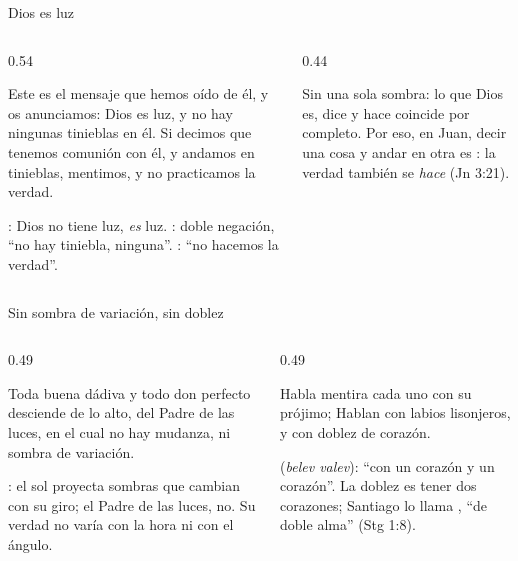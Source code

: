\begin{frame}{Dios es luz}
\begin{columns}[t,onlytextwidth]
\begin{column}{0.54\textwidth}
\begin{cita}Este es el mensaje que hemos oído de él, y os anunciamos: Dios es luz, y no hay ningunas tinieblas en él. Si decimos que tenemos comunión con él, y andamos en tinieblas, mentimos, y no practicamos la verdad.\end{cita}
\scriptsize{}: Dios no tiene luz, \emph{es} luz. : doble negación, ``no hay tiniebla, ninguna''. : ``no hacemos la verdad''.
\end{column}
\begin{column}{0.44\textwidth}
\centering
{}\par\smallskip
\small Sin una sola sombra: lo que Dios es, dice y hace coincide por completo. Por eso, en Juan, decir una cosa y andar en otra es : la verdad también se \emph{hace} (Jn 3:21).
\end{column}
\end{columns}
\end{frame}

\begin{frame}{Sin sombra de variación, sin doblez}
\begin{columns}[t,onlytextwidth]
\begin{column}{0.49\textwidth}
\begin{cita}Toda buena dádiva y todo don perfecto desciende de lo alto, del Padre de las luces, en el cual no hay mudanza, ni sombra de variación.\end{cita}
\scriptsize{}: el sol proyecta sombras que cambian con su giro; el Padre de las luces, no. Su verdad no varía con la hora ni con el ángulo.
\end{column}
\begin{column}{0.49\textwidth}
\begin{cita}Habla mentira cada uno con su prójimo; Hablan con labios lisonjeros, y con doblez de corazón.\end{cita}
\scriptsize{} (\emph{belev valev}): ``con un corazón y un corazón''. La doblez es tener dos corazones; Santiago lo llama , ``de doble alma'' (Stg 1:8).
\end{column}
\end{columns}
\end{frame}

